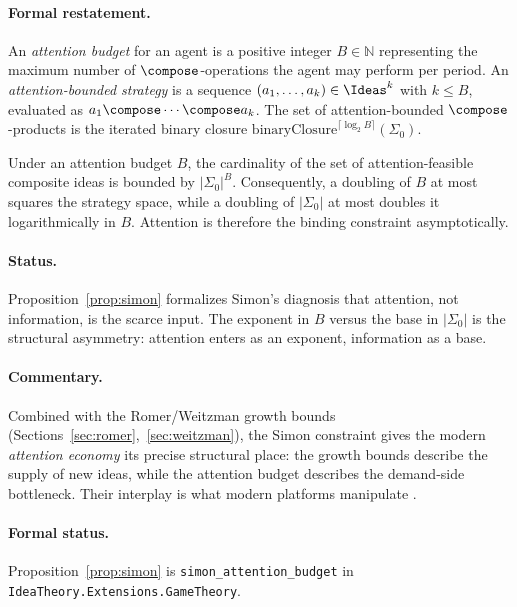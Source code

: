 \paragraph{Formal restatement.} An \emph{attention budget} for an agent
is a positive integer $B\in\mathbb{N}$ representing the maximum number
of $\compose$-operations the agent may perform per period. An
\emph{attention-bounded strategy} is a sequence
$(a_1,\dots,a_k)\in\Ideas^k$ with $k\leq B$, evaluated as
$a_1\compose\cdots\compose a_k$. The set of attention-bounded
$\compose$-products is the iterated binary closure
$\mathrm{binaryClosure}^{\lceil\log_2 B\rceil}(\Sigma_0)$.

\begin{proposition}
\label{prop:simon}
Under an attention budget $B$, the cardinality of the set of
attention-feasible composite ideas is bounded by $|\Sigma_0|^{B}$.
Consequently, a doubling of $B$ at most squares the strategy space,
while a doubling of $|\Sigma_0|$ at most doubles it logarithmically in
$B$. Attention is therefore the binding constraint asymptotically.
\end{proposition}

\paragraph{Status.} Proposition~\ref{prop:simon} formalizes Simon's
diagnosis that attention, not information, is the scarce input. The
exponent in $B$ versus the base in $|\Sigma_0|$ is the structural
asymmetry: attention enters as an exponent, information as a base.

\paragraph{Commentary.} Combined with the Romer/Weitzman growth bounds
(Sections~\ref{sec:romer},~\ref{sec:weitzman}), the Simon constraint
gives the modern \emph{attention economy} its precise structural place:
the growth bounds describe the supply of new ideas, while the attention
budget describes the demand-side bottleneck. Their interplay is what
modern platforms manipulate \citep{Simon1971}.

\paragraph{Formal status.} Proposition~\ref{prop:simon} is
\texttt{simon\_attention\_budget} in
\texttt{IdeaTheory.Extensions.GameTheory}.

